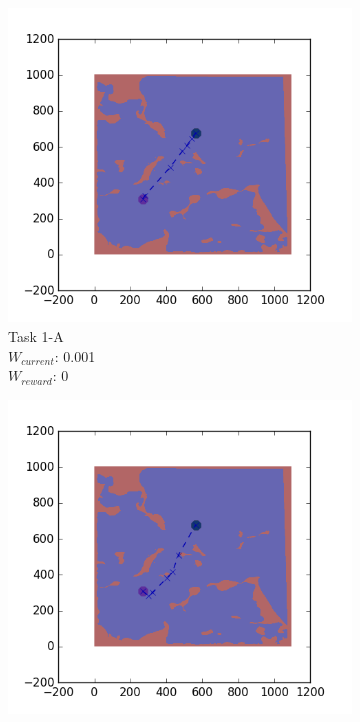 \documentclass{tamuccthesis}
\begin{document}
\begin{figure}
    \centering
    \begin{subfigure}[b]{0.24\textwidth}
        \centering
        \includegraphics[width=\textwidth,trim={4cm 3cm 2cm 3cm},clip]{EXP3RG_PathAa_-1_-1_0d001_0.png}
        \caption{{\small Task 1-A \\ $W_{current}$: 0.001 \\ $W_{reward}$: 0}}    
        \label{fig:Path_1-A_upCurrent_noReward}
    \end{subfigure}
    \begin{subfigure}[b]{0.24\textwidth}  
        \centering 
        \includegraphics[width=\textwidth,trim={4cm 3cm 2cm 3cm},clip]{EXP3RG_PathAa_-1_-1_0d001_-1.png}

\end{subfigure}
\end{figure}
\end{document}
